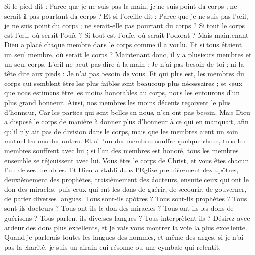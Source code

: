 \begin{multicols}{2}
Si le pied dit : Parce que je ne suis pas la main, je ne suis point du corps ; ne serait-il pas pourtant du corps ?
Et si l'oreille dit : Parce que je ne suis pas l’œil, je ne suis point du corps ; ne serait-elle pas pourtant du corps ?
Si tout le corps est l’œil, où serait l'ouïe ? Si tout est l'ouïe, où serait l'odorat ?
Mais maintenant Dieu a placé chaque membre dans le corps comme il a voulu.
Et si tous étaient un seul membre, où serait le corps ?
Maintenant donc, il y a plusieurs membres et un seul corps.
L’œil ne peut pas dire à la main : Je n'ai pas besoin de toi ; ni la tête dire aux pieds : Je n'ai pas besoin de vous.
Et qui plus est, les membres du corps qui semblent être les plus faibles sont beaucoup plus nécessaires ;
et ceux que nous estimons être les moins honorables au corps, nous les entourons d’un plus grand honneur. Ainsi, nos membres les moins décents reçoivent le plus d’honneur,
Car les parties qui sont belles en nous, n’en ont pas besoin. Mais Dieu a disposé le corps de manière à donner plus d’honneur à ce qui en manquait,
afin qu'il n'y ait pas de division dans le corps, mais que les membres aient un soin mutuel les uns des autres.
Et si l'un des membres souffre quelque chose, tous les membres souffrent avec lui ; si l'un des membres est honoré, tous les membres ensemble se réjouissent avec lui.
Vous êtes le corps de Christ, et vous êtes chacun l’un de ses membres.
Et Dieu a établi dans l'Eglise premièrement des apôtres, deuxièmement des prophètes, troisièmement des docteurs, ensuite ceux qui ont le don des miracles, puis ceux qui ont les dons de guérir, de secourir, de gouverner, de parler diverses langues.
Tous sont-ils apôtres ? Tous sont-ils prophètes ? Tous sont-ils docteurs ? Tous ont-ils le don des miracles ?
Tous ont-ils les dons de guérisons ? Tous parlent-ils diverses langues ? Tous interprètent-ils ?
Désirez avec ardeur des dons plus excellents, et je vais vous montrer la voie la plus excellente.
\VerseOne{}Quand je parlerais toutes les langues des hommes, et même des anges, si je n'ai pas la charité, je suis un airain qui résonne ou une cymbale qui retentit.

\end{multicols}
